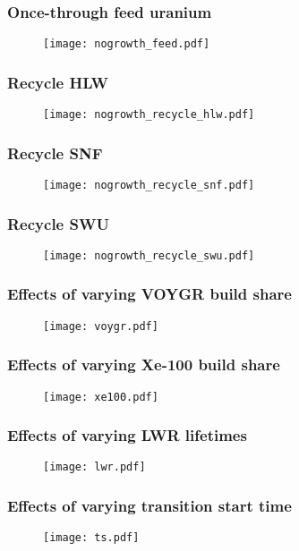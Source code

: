 \begin{frame}
    \frametitle{Once-through feed uranium}
    \begin{figure}
        \centering 
        \texttt{[image: nogrowth\_feed.pdf]}
    \end{figure}
\end{frame}

\begin{frame}
    \frametitle{Recycle HLW}
    \begin{figure}
        \centering
        \texttt{[image: nogrowth\_recycle\_hlw.pdf]}
    \end{figure}
\end{frame}

\begin{frame}
    \frametitle{Recycle SNF}
    \begin{figure}
        \centering
        \texttt{[image: nogrowth\_recycle\_snf.pdf]}
    \end{figure}
\end{frame}

\begin{frame}
    \frametitle{Recycle SWU}
    \begin{figure}
        \centering
        \texttt{[image: nogrowth\_recycle\_swu.pdf]}
    \end{figure}
\end{frame}

\begin{frame}
    \frametitle{Effects of varying VOYGR build share}
    \begin{figure}
        \centering
        \texttt{[image: voygr.pdf]}
    \end{figure}
\end{frame}

\begin{frame}
    \frametitle{Effects of varying Xe-100 build share}
    \begin{figure}
        \centering
        \texttt{[image: xe100.pdf]}
    \end{figure}
\end{frame}
\begin{frame}
    \frametitle{Effects of varying LWR lifetimes}
    \begin{figure}
        \centering
        \texttt{[image: lwr.pdf]}
    \end{figure}
\end{frame}
\begin{frame}
    \frametitle{Effects of varying transition start time}
    \begin{figure}
        \centering
        \texttt{[image: ts.pdf]}
    \end{figure}
\end{frame}


